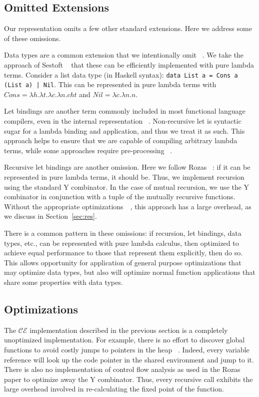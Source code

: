 \subsection{Omitted Extensions}

Our representation omits a few other standard extensions. Here we address some
of these omissions.

Data types are a common extension that we intentionally omit ~\cite{jonesstg,
boquist1997grin}.  We take the approach of Sestoft ~\cite{sestoft} that these
can be efficiently implemented with pure lambda terms. Consider a list data type
(in Haskell
syntax): \texttt{data List a = Cons a (List a) | Nil}. This can be represented in
pure lambda terms with $Cons = \lambda h.\lambda t.\lambda c.\lambda n.c h t$
and $Nil = \lambda c.\lambda n.n$. 

Let bindings are another term commonly included in most functional language
compilers, even in the internal representation ~\cite{boquist1997grin,jonesstg}.
Non-recursive let is syntactic sugar for a lambda binding and application, and
thus we treat it as such. This approach helps to ensure that we are capable of
compiling arbitrary lambda terms, while some approaches require pre-processing
~\cite{sestoft, TIM}.

Recursive let bindings are another omission. Here we follow Rozas
~\cite{rozas1992taming}: if it can be represented in pure lambda terms, it should
be. Thus, we implement recursion using the standard Y combinator. In the case of
mutual recursion, we use the Y combinator in conjunction with a tuple of the
mutually recursive functions. Without the appropriate
optimizations~~\cite{rozas1992taming}, this approach has a large overhead, as we
discuss in Section~\ref{sec:res}.

There is a common pattern in these omissions: if recursion, let bindings, data
types, etc., can be represented with pure lambda calculus, then optimized to
achieve equal performance to those that represent them explicitly, then do so.
This allows opportunity for application of general purpose optimizations that
may optimize data types, but also will optimize normal function applications
that share some properties with data types.

\subsection{Optimizations}

The $\mathcal{CE}$ implementation described in the previous section is a
completely unoptimized implementation. For example, there is no effort to
discover global functions to avoid costly jumps to pointers in the heap
~\cite{jonesstg}. Indeed, every variable reference will look up the code pointer
in the shared environment and jump to it. There is also no implementation of 
control flow analysis as used in the Rozas paper to optimize away the Y
combinator.  Thus, every recursive call exhibits the large overhead involved in
re-calculating the fixed point of the function.  

